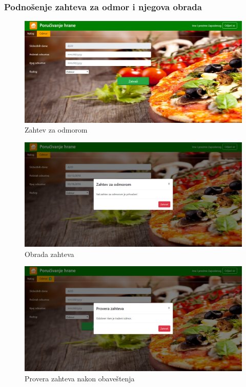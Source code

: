   \subsubsection{Podno\v senje zahteva za odmor i njegova obrada }
   \begin{figure}[!h]
    \includegraphics[width=1\textwidth]{slike/odmor.png}
    \caption{Zahtev za odmorom} %
    \label{fig:slika_odmor}
\end{figure}
 \begin{figure}[!h]
    \includegraphics[width=1\textwidth]{slike/odmor1.png}
    \caption{Obrada zahteva} %
    \label{fig:slika_obrada1}
\end{figure}

 \begin{figure}[!h]
    \includegraphics[width=1\textwidth]{slike/odmor2.png}
    \caption{Provera zahteva nakon obaveštenja} %
    \label{fig:slika_obrada2}
\end{figure}
  
